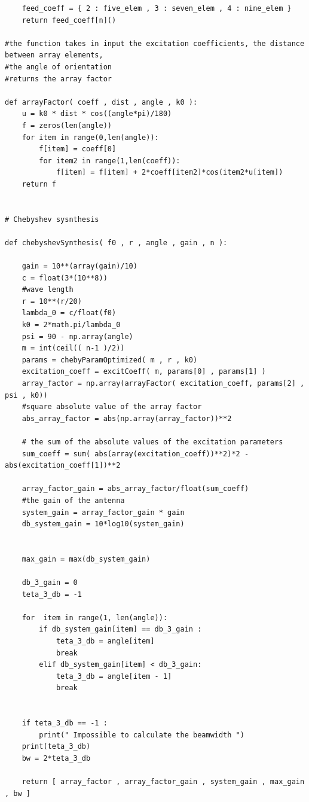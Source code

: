 \begin{verbatim}
    feed_coeff = { 2 : five_elem , 3 : seven_elem , 4 : nine_elem }
    return feed_coeff[n]()

#the function takes in input the excitation coefficients, the distance between array elements, 
#the angle of orientation
#returns the array factor

def arrayFactor( coeff , dist , angle , k0 ):
    u = k0 * dist * cos((angle*pi)/180)
    f = zeros(len(angle))
    for item in range(0,len(angle)):
        f[item] = coeff[0]
        for item2 in range(1,len(coeff)):
            f[item] = f[item] + 2*coeff[item2]*cos(item2*u[item])
    return f


# Chebyshev sysnthesis

def chebyshevSynthesis( f0 , r , angle , gain , n ):

    gain = 10**(array(gain)/10)
    c = float(3*(10**8))
    #wave length
    r = 10**(r/20)
    lambda_0 = c/float(f0)
    k0 = 2*math.pi/lambda_0
    psi = 90 - np.array(angle)
    m = int(ceil(( n-1 )/2))
    params = chebyParamOptimized( m , r , k0)
    excitation_coeff = excitCoeff( m, params[0] , params[1] )
    array_factor = np.array(arrayFactor( excitation_coeff, params[2] , psi , k0))
    #square absolute value of the array factor
    abs_array_factor = abs(np.array(array_factor))**2

    # the sum of the absolute values of the excitation parameters
    sum_coeff = sum( abs(array(excitation_coeff))**2)*2 - abs(excitation_coeff[1])**2 
    
    array_factor_gain = abs_array_factor/float(sum_coeff)
    #the gain of the antenna
    system_gain = array_factor_gain * gain
    db_system_gain = 10*log10(system_gain)

    
    max_gain = max(db_system_gain)
    
    db_3_gain = 0
    teta_3_db = -1

    for  item in range(1, len(angle)):
        if db_system_gain[item] == db_3_gain :
            teta_3_db = angle[item]
            break
        elif db_system_gain[item] < db_3_gain:
            teta_3_db = angle[item - 1]
            break
    

    if teta_3_db == -1 :
        print(" Impossible to calculate the beamwidth ")
    print(teta_3_db)
    bw = 2*teta_3_db

    return [ array_factor , array_factor_gain , system_gain , max_gain , bw ]



\end{verbatim}

